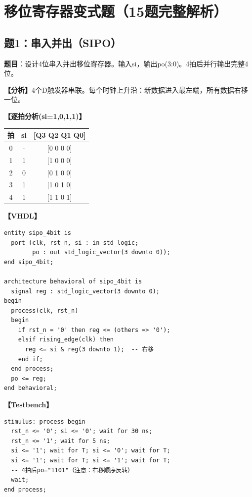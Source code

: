 \chapter{移位寄存器变式题（15题完整解析）}

\section{题1：串入并出（SIPO）}

\textbf{题目}：设计4位串入并出移位寄存器。输入si，输出po(3:0)。4拍后并行输出完整4位。

\begin{solution}[完整解答]

\textbf{【分析】}4个D触发器串联。每个时钟上升沿：新数据进入最左端，所有数据右移一位。

\textbf{【逐拍分析(si=1,0,1,1)】}
\begin{center}
\begin{tabular}{|c|c|c|}\hline
拍 & si & [Q3 Q2 Q1 Q0] \\ \hline
0 & - & [0 0 0 0] \\ \hline
1 & 1 & [1 0 0 0] \\ \hline
2 & 0 & [0 1 0 0] \\ \hline
3 & 1 & [1 0 1 0] \\ \hline
4 & 1 & [1 1 0 1] \\ \hline
\end{tabular}
\end{center}

\textbf{【VHDL】}
\begin{lstlisting}
entity sipo_4bit is
  port (clk, rst_n, si : in std_logic;
        po : out std_logic_vector(3 downto 0));
end sipo_4bit;

architecture behavioral of sipo_4bit is
  signal reg : std_logic_vector(3 downto 0);
begin
  process(clk, rst_n)
  begin
    if rst_n = '0' then reg <= (others => '0');
    elsif rising_edge(clk) then
      reg <= si & reg(3 downto 1);  -- 右移
    end if;
  end process;
  po <= reg;
end behavioral;
\end{lstlisting}

\textbf{【Testbench】}
\begin{lstlisting}
stimulus: process begin
  rst_n <= '0'; si <= '0'; wait for 30 ns;
  rst_n <= '1'; wait for 5 ns;
  si <= '1'; wait for T; si <= '0'; wait for T;
  si <= '1'; wait for T; si <= '1'; wait for T;
  -- 4拍后po="1101"（注意：右移顺序反转）
  wait;
end process;
\end{lstlisting}

\end{solution}


